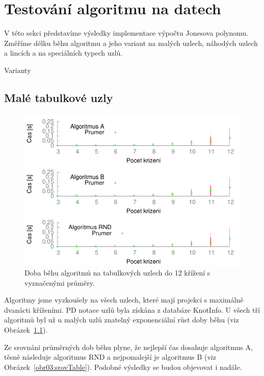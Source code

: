 
\chapter{Testování algoritmu na datech}

V této sekci představíme výsledky implementace výpočtu Jonesova polynomu. Změříme délku běhu algoritmu a jeho variant na malých uzlech, náhodých uzlech a lincích a na speciálních typech uzlů.

Varianty

\section{Malé tabulkové uzly}

\begin{figure}[p]\centering
\includegraphics{../img/multiTable}
\caption{Doba běhu algoritmů na tabulkových uzlech do 12 křížení s vyznačenými průměry.}
\label{obr03:multiTable}
\end{figure}

Algoritmy jsme vyzkoušely na všech uzlech, které mají projekci s maximálně dvanácti kříženími. PD notace uzlů byla získána z databáze KnotInfo. 
U všech tří algoritmů byl už u malých uzlů znatelný exponenciální růst doby běhu (viz Obrázek~\ref{obr03:multiTable}).
 

Ze srovnání průměrných dob běhu plyne, že nejlepší čas dosahuje algoritmus A, těsně následuje algoritmus RND a nejpomalejší je algoritmus B (viz Obrázek~\ref{obr03:srovTable}). Podobné výsledky se budou objevovat i nadále.
	
